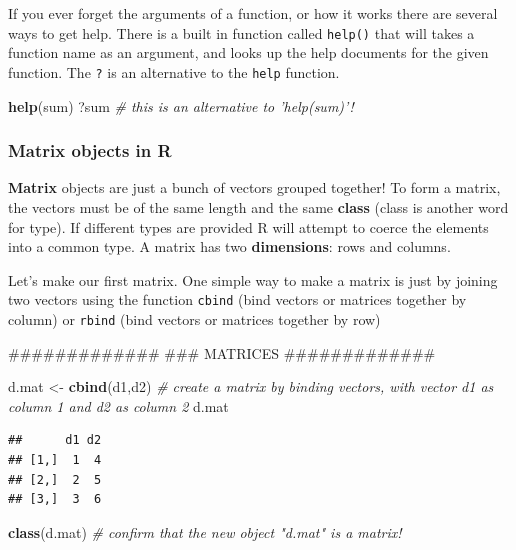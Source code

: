 \documentclass[]{article}
\newenvironment{Shaded}{\begin{snugshade}}{\end{snugshade}}
\newcommand{\KeywordTok}[1]{\textcolor[rgb]{0.13,0.29,0.53}{\textbf{#1}}}
\newcommand{\StringTok}[1]{\textcolor[rgb]{0.31,0.60,0.02}{#1}}
\newcommand{\CommentTok}[1]{\textcolor[rgb]{0.56,0.35,0.01}{\textit{#1}}}
\newcommand{\NormalTok}[1]{#1}
\begin{document}
If you ever forget the arguments of a function, or how it works there
are several ways to get help. There is a built in function called
\texttt{help()} that will takes a function name as an argument, and
looks up the help documents for the given function. The \texttt{?} is an
alternative to the \texttt{help} function.

\begin{Shaded}
\begin{Highlighting}[]
\KeywordTok{help}\NormalTok{(sum)}
\NormalTok{?sum    }\CommentTok{# this is an alternative to 'help(sum)'!}
\end{Highlighting}
\end{Shaded}

\subsubsection{Matrix objects in R}\label{matrix-objects-in-r}

\textbf{Matrix} objects are just a bunch of vectors grouped together! To
form a matrix, the vectors must be of the same length and the same
\textbf{class} (class is another word for type). If different types are
provided R will attempt to coerce the elements into a common type. A
matrix has two \textbf{dimensions}: rows and columns.

Let's make our first matrix. One simple way to make a matrix is just by
joining two vectors using the function \texttt{cbind} (bind vectors or
matrices together by column) or \texttt{rbind} (bind vectors or matrices
together by row)

\begin{Shaded}
\begin{Highlighting}[]
\NormalTok{#############}
\NormalTok{### MATRICES}
\NormalTok{#############}

\NormalTok{d.mat <-}\StringTok{ }\KeywordTok{cbind}\NormalTok{(d1,d2)        }\CommentTok{# create a matrix by binding vectors, with vector d1 as column 1 and d2 as column 2}
\NormalTok{d.mat}
\end{Highlighting}
\end{Shaded}

\begin{verbatim}
##      d1 d2
## [1,]  1  4
## [2,]  2  5
## [3,]  3  6
\end{verbatim}

\begin{Shaded}
\begin{Highlighting}[]
\KeywordTok{class}\NormalTok{(d.mat)   }\CommentTok{# confirm that the new object "d.mat" is a matrix!}
\end{Highlighting}
\end{Shaded}
\end{document}
